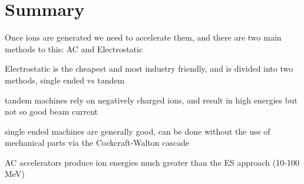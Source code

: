 \section{Summary}\label{sec:summary}

\begin{myitemize}
	\item Once ions are generated we need to accelerate them, and there are two main methods to this: AC and Electrostatic
	\item Electrostatic is the cheapest and most industry friendly, and is divided into two methods, single ended vs tandem
	\item tandem machines rely on negatively charged ions, and result in high energies but not so good beam current
	\item single ended machines are generally good, can be done without the use of mechanical parts via the Cockcraft-Walton cascade
	\item AC accelerators produce ion energies much greater than the ES approach (10-100 MeV)
\end{myitemize}

